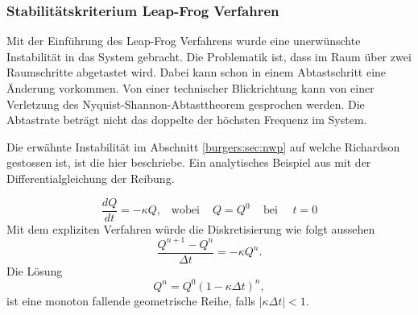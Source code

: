 \subsubsection{Stabilit\"atskriterium Leap-Frog Verfahren}
	Mit der Einf\"uhrung des Leap-Frog Verfahrens wurde eine unerw\"unschte Instabilit\"at in das System gebracht.
	Die Problematik ist, dass im Raum über zwei Raumschritte abgetastet wird.
	Dabei kann schon in einem Abtastschritt eine Änderung vorkommen.
	Von einer technischer Blickrichtung kann von einer Verletzung des Nyquist-Shannon-Abtasttheorem gesprochen werden.
	Die Abtastrate beträgt nicht das doppelte der höchsten Frequenz im System.

	\medskip

	Die erw\"ahnte Instabilit\"at im Abschnitt \ref{burgers:sec:nwp} auf welche Richardson gestossen ist, ist die hier beschriebe.
	Ein analytisches Beispiel aus \cite{burgers:lynch_2014} mit der Differentialgleichung der Reibung.

	\begin{equation}
		\frac{dQ}{dt} = - \kappa Q, \,\,\,\,\, \text{wobei} \, \,\,\,\,\,\, Q=Q^0 \,\,\,\,\,\,\, \text{bei} \,\,\,\,\,\,\,\, t=0
	\end{equation}
	Mit dem expliziten Verfahren w\"urde die Diskretisierung wie folgt aussehen
	\begin{equation}
		\frac{Q^{n+1}-Q^n}{\Delta t} = - \kappa Q^n.
	\end{equation}
	Die L\"osung
		\begin{equation}
			Q^n = Q^0(1-\kappa \Delta t)^n,
		\end{equation}
	ist eine monoton fallende geometrische Reihe, falls $|\kappa \Delta t| <1$.

